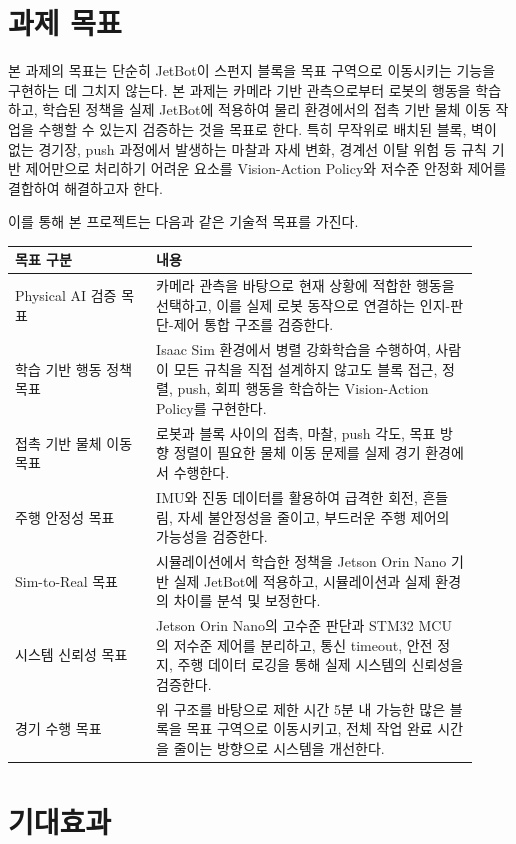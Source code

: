 \documentclass[titlepage]{pnureport}
\begin{document}
\section{과제 목표}

본 과제의 목표는 단순히 JetBot이 스펀지 블록을 목표 구역으로 이동시키는 기능을 구현하는 데 그치지 않는다. 본 과제는 카메라 기반 관측으로부터 로봇의 행동을 학습하고, 학습된 정책을 실제 JetBot에 적용하여 물리 환경에서의 접촉 기반 물체 이동 작업을 수행할 수 있는지 검증하는 것을 목표로 한다. 특히 무작위로 배치된 블록, 벽이 없는 경기장, push 과정에서 발생하는 마찰과 자세 변화, 경계선 이탈 위험 등 규칙 기반 제어만으로 처리하기 어려운 요소를 Vision-Action Policy와 저수준 안정화 제어를 결합하여 해결하고자 한다.

이를 통해 본 프로젝트는 다음과 같은 기술적 목표를 가진다.

\begin{longtable}{p{0.28\linewidth}p{0.64\linewidth}}
\toprule
목표 구분 & 내용 \\
\midrule
\endhead
Physical AI 검증 목표 & 카메라 관측을 바탕으로 현재 상황에 적합한 행동을 선택하고, 이를 실제 로봇 동작으로 연결하는 인지-판단-제어 통합 구조를 검증한다. \\
학습 기반 행동 정책 목표 & Isaac Sim 환경에서 병렬 강화학습을 수행하여, 사람이 모든 규칙을 직접 설계하지 않고도 블록 접근, 정렬, push, 회피 행동을 학습하는 Vision-Action Policy를 구현한다. \\
접촉 기반 물체 이동 목표 & 로봇과 블록 사이의 접촉, 마찰, push 각도, 목표 방향 정렬이 필요한 물체 이동 문제를 실제 경기 환경에서 수행한다. \\
주행 안정성 목표 & IMU와 진동 데이터를 활용하여 급격한 회전, 흔들림, 자세 불안정성을 줄이고, 부드러운 주행 제어의 가능성을 검증한다. \\
Sim-to-Real 목표 & 시뮬레이션에서 학습한 정책을 Jetson Orin Nano 기반 실제 JetBot에 적용하고, 시뮬레이션과 실제 환경의 차이를 분석 및 보정한다. \\
시스템 신뢰성 목표 & Jetson Orin Nano의 고수준 판단과 STM32 MCU의 저수준 제어를 분리하고, 통신 timeout, 안전 정지, 주행 데이터 로깅을 통해 실제 시스템의 신뢰성을 검증한다. \\
경기 수행 목표 & 위 구조를 바탕으로 제한 시간 5분 내 가능한 많은 블록을 목표 구역으로 이동시키고, 전체 작업 완료 시간을 줄이는 방향으로 시스템을 개선한다. \\
\bottomrule
\end{longtable}

\section{기대효과}
\end{document}
